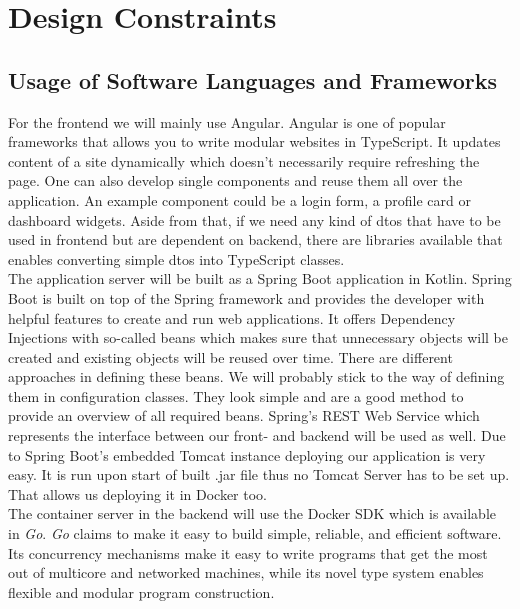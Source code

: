 \documentclass[a4paper,12pt,chapterprefix=false,bibliography=totoc,listof=totoc,]{scrreprt}
\begin{document}
\section{Design Constraints}

\subsection{Usage of Software Languages and Frameworks}
For the frontend we will mainly use Angular. Angular is one of popular frameworks that allows you to write modular websites in TypeScript. It updates content of a site dynamically which doesn't necessarily require refreshing the page. One can also develop single components and reuse them all over the application. An example component could be a login form, a profile card or dashboard widgets. Aside from that, if we need any kind of \gls{dto}s that have to be used in frontend but are dependent on backend, there are libraries available that enables converting simple \gls{dto}s into TypeScript classes. \\

The application server will be built as a Spring Boot application in Kotlin. Spring Boot is built on top of the Spring framework and provides the developer with helpful features to create and run web applications. It offers Dependency Injections with so-called beans which makes sure that unnecessary objects will be created and existing objects will be reused over time. There are different approaches in defining these beans. We will probably stick to the way of defining them in configuration classes. They look simple and are a good method to provide an overview of all required beans. Spring's REST Web Service which represents the interface between our front- and backend will be used as well. Due to Spring Boot's embedded Tomcat instance deploying our application is very easy. It is run upon start of built .jar file thus no Tomcat Server has to be set up. That allows us deploying it in Docker too. \\

The container server in the backend will use the Docker SDK which is available in \emph{Go}. \emph{Go} claims to make it easy to build simple, reliable, and efficient software. Its concurrency mechanisms make it easy to write programs that get the most out of multicore and networked machines, while its novel type system enables flexible and modular program construction.
\end{document}
